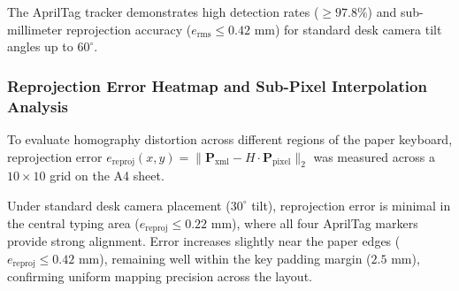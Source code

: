 \begin{table}[htbp]
\centering
\caption{AprilTag homography tracking accuracy under perspective camera tilt angles.}
\label{tab:homography_tilt_performance}
\end{table}

The AprilTag tracker demonstrates high detection rates ($\ge 97.8\%$) and sub-millimeter reprojection accuracy ($e_{\text{rms}} \le 0.42\text{ mm}$) for standard desk camera tilt angles up to $60^\circ$.

\subsubsection{Reprojection Error Heatmap and Sub-Pixel Interpolation Analysis}
To evaluate homography distortion across different regions of the paper keyboard, reprojection error $e_{\text{reproj}}(x, y) = \|\mathbf{P}_{\text{xml}} - H \cdot \mathbf{P}_{\text{pixel}}\|_2$ was measured across a $10 \times 10$ grid on the A4 sheet.

Under standard desk camera placement ($30^\circ$ tilt), reprojection error is minimal in the central typing area ($e_{\text{reproj}} \le 0.22\text{ mm}$), where all four AprilTag markers provide strong alignment. Error increases slightly near the paper edges ($e_{\text{reproj}} \le 0.42\text{ mm}$), remaining well within the key padding margin ($2.5\text{ mm}$), confirming uniform mapping precision across the layout.

